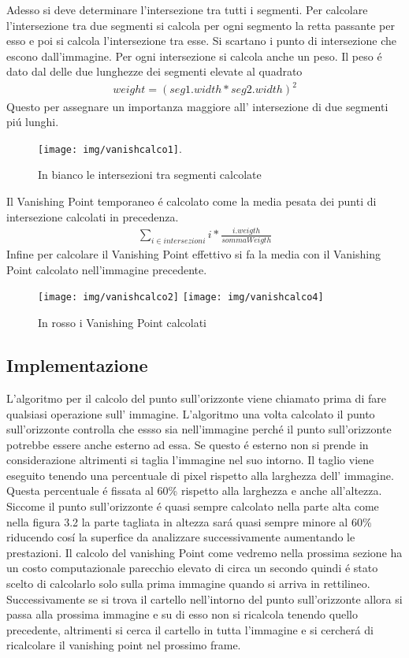 		Adesso si deve determinare l'intersezione tra tutti i segmenti. Per calcolare l'intersezione tra due segmenti si calcola per ogni segmento la retta passante per esso e poi si calcola l'intersezione tra esse. Si scartano i punto di intersezione che escono dall'immagine. Per ogni intersezione si calcola anche un peso. Il peso \'e dato dal delle due lunghezze dei segmenti elevate al quadrato
		\begin{align*}
			weight = (seg1.width * seg2.width)^{2}
		\end{align*}
		Questo per assegnare un importanza maggiore all' intersezione di due segmenti pi\'u lunghi.
		\begin{figure}[!ht]
			\centering
			\texttt{[image: img/vanishcalco1]}.
			\caption{In bianco le intersezioni tra segmenti calcolate}
		\end{figure}
		Il Vanishing Point temporaneo \'e calcolato come la media pesata dei punti di intersezione calcolati in precedenza.
		\begin{align*}
			\sum\limits_{i \in intersezioni} i * \frac{i.weigth}{sommaWeigth}
		\end{align*}
		Infine per calcolare il Vanishing Point effettivo si fa la media con il Vanishing Point calcolato nell'immagine precedente.

		\begin{figure}[!ht]
			\centering
			\texttt{[image: img/vanishcalco2]}
			\hspace{7mm}
			\texttt{[image: img/vanishcalco4]}
			\caption{In rosso i Vanishing Point calcolati}
		\end{figure}

	\subsection{Implementazione}
		L'algoritmo per il calcolo del punto sull'orizzonte viene chiamato prima di fare qualsiasi operazione sull' immagine. L'algoritmo una volta calcolato il punto sull'orizzonte controlla che essso sia nell'immagine perch\'e il punto sull'orizzonte potrebbe essere anche esterno ad essa. Se questo \'e esterno non si prende in considerazione altrimenti si taglia l'immagine nel suo intorno. Il taglio viene eseguito tenendo una percentuale di pixel rispetto alla larghezza dell' immagine. Questa percentuale \'e fissata al 60\% rispetto alla larghezza e anche all'altezza. Siccome il punto sull'orizzonte \'e quasi sempre calcolato nella parte alta come nella figura 3.2 la parte tagliata in altezza sar\'a quasi sempre minore al 60\% riducendo cos\'i la superfice da analizzare successivamente aumentando le prestazioni. \newline
		Il calcolo del vanishing Point come vedremo nella prossima sezione ha un costo computazionale parecchio elevato di circa un secondo quindi \'e stato scelto di calcolarlo solo sulla prima immagine quando si arriva in rettilineo. Successivamente se si trova il cartello nell'intorno del punto sull'orizzonte allora si passa alla prossima immagine e su di esso non si ricalcola tenendo quello precedente, altrimenti si cerca il cartello in tutta l'immagine e si cercher\'a di ricalcolare il vanishing point nel prossimo frame.

